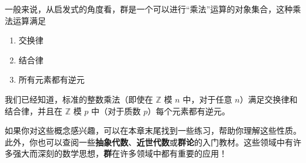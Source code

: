 一般来说，从启发式的角度看，群是一个可以进行``乘法''运算的对象集合，这种乘法运算满足
\begin{enumerate}[label=(\alph*)]
    \item 交换律
    \item 结合律
    \item 所有元素都有逆元
\end{enumerate}
我们已经知道，标准的整数乘法（即使在 $\mathbb{Z}$ 模 $n$ 中，对于任意 $n$）满足交换律和结合律，并且在 $\mathbb{Z}$ 模 $p$ 中（对于质数 $p$）每个元素都有逆元。

如果你对这些概念感兴趣，可以在本章末尾找到一些练习，帮助你理解这些性质。此外，你也可以查阅一些\textbf{抽象代数}、\textbf{近世代数}或\textbf{群论}的入门教材。这些领域中有许多强大而深刻的数学思想，\textbf{群}在许多领域中都有重要的应用！
